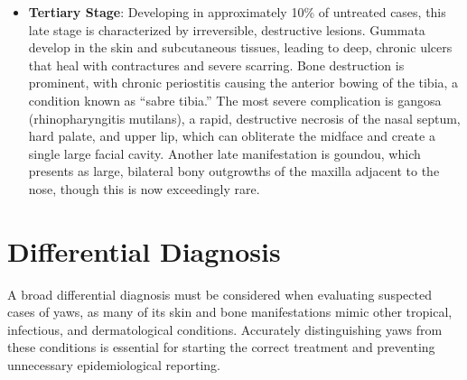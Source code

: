 \begin{itemize}
    \item \textbf{Tertiary Stage}: Developing in approximately 10\% of untreated cases, this late stage is characterized by irreversible, destructive lesions. Gummata develop in the skin and subcutaneous tissues, leading to deep, chronic ulcers that heal with contractures and severe scarring. Bone destruction is prominent, with chronic periostitis causing the anterior bowing of the tibia, a condition known as ``sabre tibia.'' The most severe complication is gangosa (rhinopharyngitis mutilans), a rapid, destructive necrosis of the nasal septum, hard palate, and upper lip, which can obliterate the midface and create a single large facial cavity. Another late manifestation is goundou, which presents as large, bilateral bony outgrowths of the maxilla adjacent to the nose, though this is now exceedingly rare.
\end{itemize}

\section*{Differential Diagnosis}
A broad differential diagnosis must be considered when evaluating suspected cases of yaws, as many of its skin and bone manifestations mimic other tropical, infectious, and dermatological conditions. Accurately distinguishing yaws from these conditions is essential for starting the correct treatment and preventing unnecessary epidemiological reporting.

